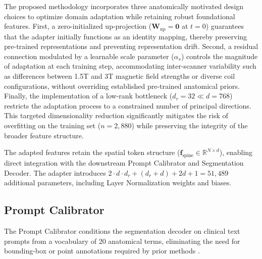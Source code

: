 \documentclass[journal]{IEEEtran}
\begin{document}
The proposed methodology incorporates three anatomically motivated design choices to optimize domain adaptation while retaining robust foundational features. First, a zero-initialized up-projection ($\mathbf{W}_{\text{up}} = \mathbf{0}$ at $t=0$) guarantees that the adapter initially functions as an identity mapping, thereby preserving pre-trained representations and preventing representation drift. Second, a residual connection modulated by a learnable scale parameter ($\alpha_s$) controls the magnitude of adaptation at each training step, accommodating inter-scanner variability such as differences between 1.5T and 3T magnetic field strengths or diverse coil configurations, without overriding established pre-trained anatomical priors. Finally, the implementation of a low-rank bottleneck ($d_r=32 \ll d=768$) restricts the adaptation process to a constrained number of principal directions. This targeted dimensionality reduction significantly mitigates the risk of overfitting on the training set ($n=2,880$) while preserving the integrity of the broader feature structure.

The adapted features retain the spatial token structure ($\mathbf{f}_{\text{spine}} \in \mathbb{R}^{N \times d}$), enabling direct integration with the downstream Prompt Calibrator and Segmentation Decoder. The adapter introduces $2 \cdot d \cdot d_r + (d_r + d) + 2d + 1 = 51,489$ additional parameters, including Layer Normalization weights and biases.

\subsection{Prompt Calibrator}
\label{sec:prompt_calibrator}
The Prompt Calibrator conditions the segmentation decoder on clinical text prompts from a vocabulary of 20 anatomical terms, eliminating the need for bounding-box or point annotations required by prior methods \cite{kirillov2023segment, cheng2023sammed2d, ma2024medsam}.
\end{document}
